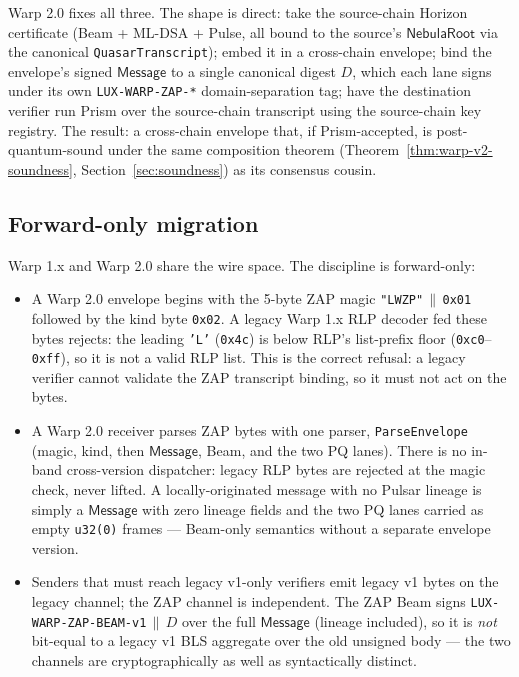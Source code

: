 Warp 2.0 fixes all three. The shape is direct: take the source-chain Horizon certificate (Beam + ML-DSA + Pulse, all bound to the source's $\mathsf{NebulaRoot}$ via the canonical \texttt{QuasarTranscript}); embed it in a cross-chain envelope; bind the envelope's signed $\mathsf{Message}$ to a single canonical digest $D$, which each lane signs under its own \texttt{LUX-WARP-ZAP-*} domain-separation tag; have the destination verifier run Prism over the source-chain transcript using the source-chain key registry. The result: a cross-chain envelope that, if Prism-accepted, is post-quantum-sound under the same composition theorem (Theorem~\ref{thm:warp-v2-soundness}, Section~\ref{sec:soundness}) as its consensus cousin.

\subsection{Forward-only migration}

Warp 1.x and Warp 2.0 share the wire space. The discipline is forward-only:
\begin{itemize}[leftmargin=2em,nosep]
  \item A Warp 2.0 envelope begins with the 5-byte ZAP magic \texttt{"LWZP"}$\,\|\,$\texttt{0x01} followed by the kind byte \texttt{0x02}. A legacy Warp 1.x RLP decoder fed these bytes rejects: the leading \texttt{'L'} (\texttt{0x4c}) is below RLP's list-prefix floor (\texttt{0xc0}--\texttt{0xff}), so it is not a valid RLP list. This is the correct refusal: a legacy verifier cannot validate the ZAP transcript binding, so it must not act on the bytes.
  \item A Warp 2.0 receiver parses ZAP bytes with one parser, \texttt{ParseEnvelope} (magic, kind, then $\mathsf{Message}$, Beam, and the two PQ lanes). There is no in-band cross-version dispatcher: legacy RLP bytes are rejected at the magic check, never lifted. A locally-originated message with no Pulsar lineage is simply a $\mathsf{Message}$ with zero lineage fields and the two PQ lanes carried as empty \texttt{u32(0)} frames --- Beam-only semantics without a separate envelope version.
  \item Senders that must reach legacy v1-only verifiers emit legacy v1 bytes on the legacy channel; the ZAP channel is independent. The ZAP Beam signs \texttt{LUX-WARP-ZAP-BEAM-v1}$\,\|\,D$ over the full $\mathsf{Message}$ (lineage included), so it is \emph{not} bit-equal to a legacy v1 BLS aggregate over the old unsigned body --- the two channels are cryptographically as well as syntactically distinct.
\end{itemize}


